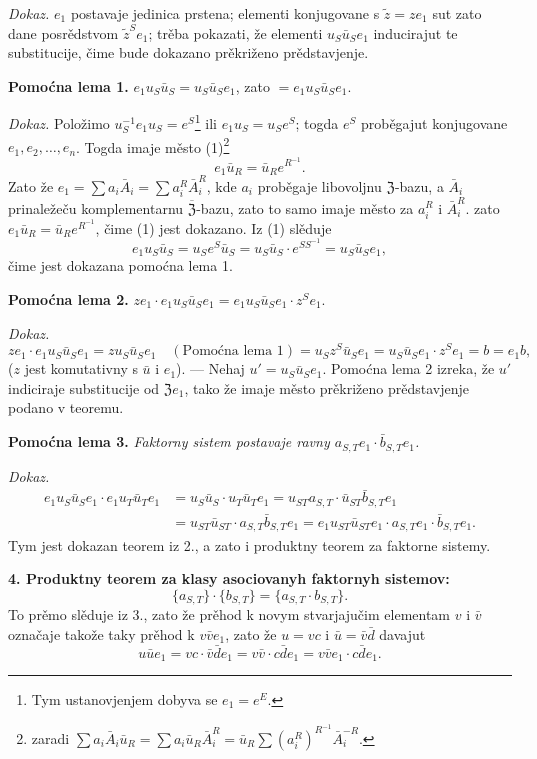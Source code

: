\documentclass[11pt]{article}
\newcommand{\srcfn}[2]{\footnote{#2}}
\begin{document}
\noindent\emph{Dokaz.} \(e_1\) postavaje jedinica prstena; elementi konjugovane s \(\tilde z=ze_1\) sut zato dane posrědstvom \(\tilde z^Se_1\); trěba pokazati, že elementi \(u_S\bar u_Se_1\) inducirajut te substitucije, čime bude dokazano prěkriženo prědstavjenje.

\noindent\textbf{Pomoćna lema 1.} \(e_1u_S\bar u_S=u_S\bar u_Se_1\), zato \(=e_1u_S\bar u_Se_1\).

\noindent\emph{Dokaz.} Položimo \(u_S^{-1}e_1u_S=e^S\)\srcfn{1}{Tym ustanovjenjem dobyva se \(e_1=e^E\).} ili \(e_1u_S=u_Se^S\); togda \(e^S\) proběgajut konjugovane \(e_1,e_2,\ldots,e_n\). Togda imaje město (1)\srcfn{2}{zaradi \(\sum a_i\bar A_i\bar u_R=\sum a_i\bar u_R\bar A_i^R=\bar u_R\sum(a_i^R)^{R^{-1}}\bar A_i^{-R}\).}
\[
e_1\bar u_R=\bar u_Re^{R^{-1}}.
\]
Zato že \(e_1=\sum a_i\bar A_i=\sum a_i^R\bar A_i^R\), kde \(a_i\) proběgaje libovoljnu \(\mathfrak Z\)-bazu, a \(\bar A_i\) prinaležeču komplementarnu \(\overline{\mathfrak Z}\)-bazu, zato to samo imaje město za \(a_i^R\) i \(\bar A_i^R\). zato \(e_1\bar u_R=\bar u_Re^{R^{-1}}\), čime (1) jest dokazano. Iz (1) slěduje
\[
e_1u_S\bar u_S=u_Se^S\bar u_S=u_S\bar u_S\cdot e^{SS^{-1}}=u_S\bar u_Se_1,
\]
čime jest dokazana pomoćna lema 1.

\noindent\textbf{Pomoćna lema 2.} \(ze_1\cdot e_1u_S\bar u_Se_1=e_1u_S\bar u_Se_1\cdot z^Se_1\).

\noindent\emph{Dokaz.} 
\[
ze_1\cdot e_1u_S\bar u_Se_1
=zu_S\bar u_Se_1\quad(\text{Pomoćna lema 1})
=u_Sz^S\bar u_Se_1
=u_S\bar u_Se_1\cdot z^Se_1
=b=e_1b,
\]
(\(z\) jest komutativny s \(\bar u\) i \(e_1\)). --- Nehaj \(u'=u_S\bar u_Se_1\). Pomoćna lema 2 izreka, že \(u'\) indiciraje substitucije od \(\mathfrak Ze_1\), tako že imaje město prěkriženo prědstavjenje podano v teoremu.

\noindent\textbf{Pomoćna lema 3.} \emph{Faktorny sistem postavaje ravny \(a_{S,T}e_1\cdot\bar b_{S,T}e_1\).}

\noindent\emph{Dokaz.}
\[
\begin{aligned}
e_1u_S\bar u_Se_1\cdot e_1u_T\bar u_Te_1
&=u_S\bar u_S\cdot u_T\bar u_Te_1
 =u_{ST}a_{S,T}\cdot\bar u_{ST}\bar b_{S,T}e_1\\
&=u_{ST}\bar u_{ST}\cdot a_{S,T}\bar b_{S,T}e_1
 =e_1u_{ST}\bar u_{ST}e_1\cdot a_{S,T}e_1\cdot\bar b_{S,T}e_1.
\end{aligned}
\]
Tym jest dokazan teorem iz 2., a zato i produktny teorem za faktorne sistemy.

\noindent\textbf{4. Produktny teorem za klasy asociovanyh faktornyh sistemov:}
\[
\{a_{S,T}\}\cdot\{b_{S,T}\}=\{a_{S,T}\cdot b_{S,T}\}.
\]
To prěmo slěduje iz 3., zato že prěhod k novym stvarjajučim elementam \(v\) i \(\bar v\) označaje takože taky prěhod k \(v\bar ve_1\), zato že \(u=vc\) i \(\bar u=\bar v\bar d\) davajut
\[
u\bar ue_1=vc\cdot\bar v\bar de_1=v\bar v\cdot c\bar de_1=v\bar ve_1\cdot c\bar de_1.
\]
\end{document}
